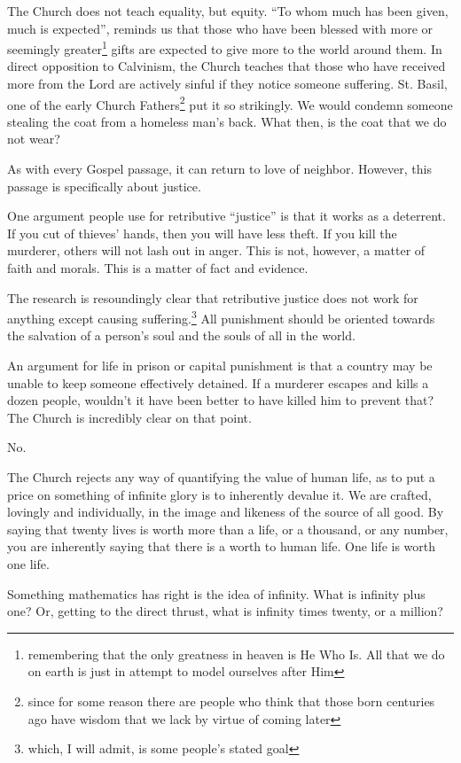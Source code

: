 \documentclass[12pt]{article}[titlepage]
\newcommand{\say}[1]{``#1''}
\renewcommand{\,}{\textsuperscript{,}}
\begin{document}
The Church does not teach equality, but equity.  
\say{To whom much has been given, much is expected}, reminds us that those who have been blessed with more or seemingly greater\footnote{remembering that the only greatness in heaven is He Who Is. All that we do on earth is just in attempt to model ourselves after Him} gifts are expected to give more to the world around them.  
In direct opposition to Calvinism, the Church teaches that those who have received more from the Lord are actively sinful if they notice someone suffering.  
St. Basil, one of the early Church Fathers\footnote{since for some reason there are people who think that those born centuries ago have wisdom that we lack by virtue of coming later} put it so strikingly.  
We would condemn someone stealing the coat from a homeless man's back.  
What then, is the coat that we do not wear?

As with every Gospel passage, it can return to love of neighbor.  
However, this passage is specifically about justice.

One argument people use for retributive \say{justice} is that it works as a deterrent.  
If you cut of thieves' hands, then you will have less theft.  
If you kill the murderer, others will not lash out in anger.  
This is not, however, a matter of faith and morals.  
This is a matter of fact and evidence.

The research is resoundingly clear that retributive justice does not work for anything except causing suffering.\footnote{which, I will admit, is some people's stated goal}  
All punishment should be oriented towards the salvation of a person's soul and the souls of all in the world.

An argument for life in prison or capital punishment is that a country may be unable to keep someone effectively detained.  
If a murderer escapes and kills a dozen people, wouldn't it have been better to have killed him to prevent that?  
The Church is incredibly clear on that point.

No.

The Church rejects any way of quantifying the value of human life, as to put a price on something of infinite glory is to inherently devalue it.  
We are crafted, lovingly and individually, in the image and likeness of the source of all good.  
By saying that twenty lives is worth more than a life, or a thousand, or any number, you are inherently saying that there is a worth to human life.  
One life is worth one life.

Something mathematics has right is the idea of infinity.  
What is infinity plus one?  
Or, getting to the direct thrust, what is infinity times twenty, or a million?
\end{document}
